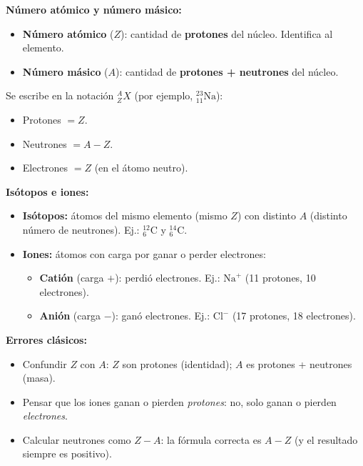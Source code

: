 \documentclass[12pt, letterpaper]{article}
\begin{document}
\begin{cuadroteoria}
  \textbf{Número atómico y número másico:}
  \begin{itemize}[leftmargin=*]
    \item \textbf{Número atómico} ($Z$): cantidad de \textbf{protones} del núcleo. Identifica al elemento.
    \item \textbf{Número másico} ($A$): cantidad de \textbf{protones + neutrones} del núcleo.
  \end{itemize}
  Se escribe en la notación ${}^{A}_{Z}X$ (por ejemplo, ${}^{23}_{11}\text{Na}$):
  \begin{itemize}[leftmargin=*]
    \item Protones $= Z$.
    \item Neutrones $= A - Z$.
    \item Electrones $= Z$ (en el átomo neutro).
  \end{itemize}
\end{cuadroteoria}

\begin{cuadroteoria}
  \textbf{Isótopos e iones:}
  \begin{itemize}[leftmargin=*]
    \item \textbf{Isótopos:} átomos del mismo elemento (mismo $Z$) con distinto $A$ (distinto número de neutrones). Ej.: ${}^{12}_{6}\text{C}$ y ${}^{14}_{6}\text{C}$.
    \item \textbf{Iones:} átomos con carga por ganar o perder electrones:
          \begin{itemize}[leftmargin=*]
            \item \textbf{Catión} (carga $+$): perdió electrones. Ej.: $\text{Na}^{+}$ (11 protones, 10 electrones).
            \item \textbf{Anión} (carga $-$): ganó electrones. Ej.: $\text{Cl}^{-}$ (17 protones, 18 electrones).
          \end{itemize}
  \end{itemize}
\end{cuadroteoria}

\begin{cuadroadvertencia}
  \textbf{Errores clásicos:}
  \begin{itemize}[leftmargin=*]
    \item Confundir $Z$ con $A$: $Z$ son protones (identidad); $A$ es protones + neutrones (masa).
    \item Pensar que los iones ganan o pierden \emph{protones}: no, solo ganan o pierden \emph{electrones}.
    \item Calcular neutrones como $Z - A$: la fórmula correcta es $A - Z$ (y el resultado siempre es positivo).
  \end{itemize}
\end{cuadroadvertencia}
\end{document}
